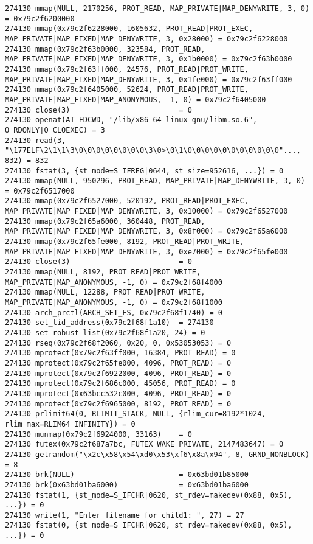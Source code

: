\begin{verbatim}
274130 mmap(NULL, 2170256, PROT_READ, MAP_PRIVATE|MAP_DENYWRITE, 3, 0) = 0x79c2f6200000
274130 mmap(0x79c2f6228000, 1605632, PROT_READ|PROT_EXEC, MAP_PRIVATE|MAP_FIXED|MAP_DENYWRITE, 3, 0x28000) = 0x79c2f6228000
274130 mmap(0x79c2f63b0000, 323584, PROT_READ, MAP_PRIVATE|MAP_FIXED|MAP_DENYWRITE, 3, 0x1b0000) = 0x79c2f63b0000
274130 mmap(0x79c2f63ff000, 24576, PROT_READ|PROT_WRITE, MAP_PRIVATE|MAP_FIXED|MAP_DENYWRITE, 3, 0x1fe000) = 0x79c2f63ff000
274130 mmap(0x79c2f6405000, 52624, PROT_READ|PROT_WRITE, MAP_PRIVATE|MAP_FIXED|MAP_ANONYMOUS, -1, 0) = 0x79c2f6405000
274130 close(3)                         = 0
274130 openat(AT_FDCWD, "/lib/x86_64-linux-gnu/libm.so.6", O_RDONLY|O_CLOEXEC) = 3
274130 read(3, "\177ELF\2\1\1\3\0\0\0\0\0\0\0\0\3\0>\0\1\0\0\0\0\0\0\0\0\0\0\0"..., 832) = 832
274130 fstat(3, {st_mode=S_IFREG|0644, st_size=952616, ...}) = 0
274130 mmap(NULL, 950296, PROT_READ, MAP_PRIVATE|MAP_DENYWRITE, 3, 0) = 0x79c2f6517000
274130 mmap(0x79c2f6527000, 520192, PROT_READ|PROT_EXEC, MAP_PRIVATE|MAP_FIXED|MAP_DENYWRITE, 3, 0x10000) = 0x79c2f6527000
274130 mmap(0x79c2f65a6000, 360448, PROT_READ, MAP_PRIVATE|MAP_FIXED|MAP_DENYWRITE, 3, 0x8f000) = 0x79c2f65a6000
274130 mmap(0x79c2f65fe000, 8192, PROT_READ|PROT_WRITE, MAP_PRIVATE|MAP_FIXED|MAP_DENYWRITE, 3, 0xe7000) = 0x79c2f65fe000
274130 close(3)                         = 0
274130 mmap(NULL, 8192, PROT_READ|PROT_WRITE, MAP_PRIVATE|MAP_ANONYMOUS, -1, 0) = 0x79c2f68f4000
274130 mmap(NULL, 12288, PROT_READ|PROT_WRITE, MAP_PRIVATE|MAP_ANONYMOUS, -1, 0) = 0x79c2f68f1000
274130 arch_prctl(ARCH_SET_FS, 0x79c2f68f1740) = 0
274130 set_tid_address(0x79c2f68f1a10)  = 274130
274130 set_robust_list(0x79c2f68f1a20, 24) = 0
274130 rseq(0x79c2f68f2060, 0x20, 0, 0x53053053) = 0
274130 mprotect(0x79c2f63ff000, 16384, PROT_READ) = 0
274130 mprotect(0x79c2f65fe000, 4096, PROT_READ) = 0
274130 mprotect(0x79c2f6922000, 4096, PROT_READ) = 0
274130 mprotect(0x79c2f686c000, 45056, PROT_READ) = 0
274130 mprotect(0x63bcc532c000, 4096, PROT_READ) = 0
274130 mprotect(0x79c2f6965000, 8192, PROT_READ) = 0
274130 prlimit64(0, RLIMIT_STACK, NULL, {rlim_cur=8192*1024, rlim_max=RLIM64_INFINITY}) = 0
274130 munmap(0x79c2f6924000, 33163)    = 0
274130 futex(0x79c2f687a7bc, FUTEX_WAKE_PRIVATE, 2147483647) = 0
274130 getrandom("\x2c\x58\x54\xd0\x53\xf6\x8a\x94", 8, GRND_NONBLOCK) = 8
274130 brk(NULL)                        = 0x63bd01b85000
274130 brk(0x63bd01ba6000)              = 0x63bd01ba6000
274130 fstat(1, {st_mode=S_IFCHR|0620, st_rdev=makedev(0x88, 0x5), ...}) = 0
274130 write(1, "Enter filename for child1: ", 27) = 27
274130 fstat(0, {st_mode=S_IFCHR|0620, st_rdev=makedev(0x88, 0x5), ...}) = 0

\end{verbatim}
